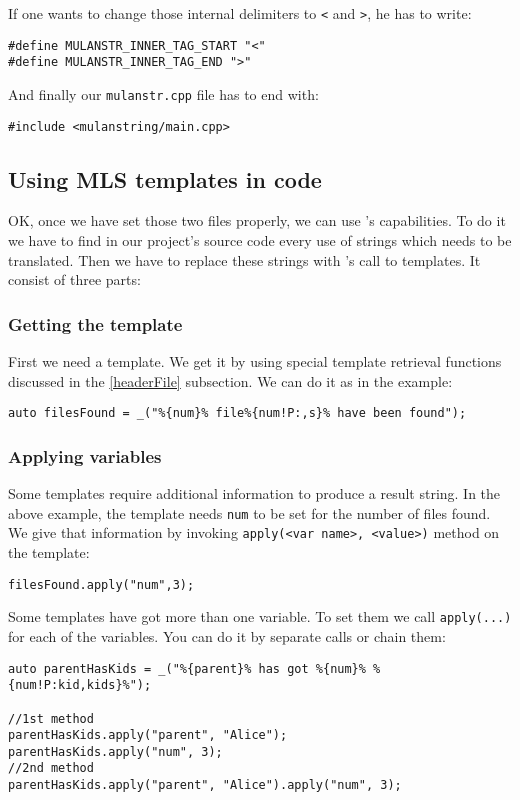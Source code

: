 If one wants to change those internal delimiters to \verb+<+ and \verb+>+, he has to write:
\begin{verbatim}
#define MULANSTR_INNER_TAG_START "<"
#define MULANSTR_INNER_TAG_END ">"
\end{verbatim}

And finally our \texttt{mulanstr.cpp} file has to end with:
\begin{verbatim}
#include <mulanstring/main.cpp>
\end{verbatim}
\subsection{Using MLS templates in code}
OK, once we have set those two files properly, we can use \mulan{}'s capabilities. 
To do it we have to find in our project's source code every use of strings which needs to be translated. 
Then we have to replace these strings with \mulan{}'s call to templates. It consist of three parts:
\subsubsection{Getting the template}
First we need a template. We get it by using special template retrieval functions discussed in the \ref{headerFile} subsection. 
We can do it as in the example:
\begin{verbatim}
auto filesFound = _("%{num}% file%{num!P:,s}% have been found");
\end{verbatim}

\subsubsection{Applying variables}
Some templates require additional information to produce a result string.
In the above example, the template needs \texttt{num} to be set for the number of files found.
We give that information by invoking \verb+apply(<var name>, <value>)+ method on the template:
\begin{verbatim}
filesFound.apply("num",3);
\end{verbatim}
Some templates have got more than one variable. To set them we call \verb+apply(...)+ for each of the variables.
You can do it by separate calls or chain them:
\begin{verbatim}
auto parentHasKids = _("%{parent}% has got %{num}% %{num!P:kid,kids}%");

//1st method
parentHasKids.apply("parent", "Alice");
parentHasKids.apply("num", 3);
//2nd method
parentHasKids.apply("parent", "Alice").apply("num", 3);
\end{verbatim}

